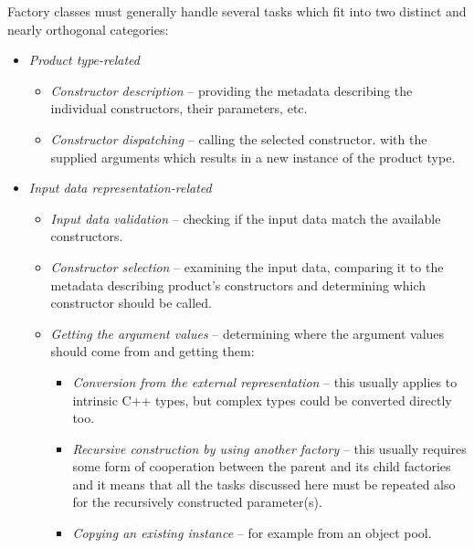 Factory classes must generally handle several tasks
which fit into two distinct and nearly orthogonal categories:

\begin{itemize}
\item{\emph{Product type-related}}
        \begin{itemize}
        \item{\emph{Constructor description}} -- providing the metadata describing
        the individual constructors, their parameters, etc.
        \item{\emph{Constructor dispatching}} -- calling the selected constructor.
        with the supplied arguments which results in a new instance of the product type.
        \end{itemize}

\item{\emph{Input data representation-related}}
        \begin{itemize}
        \item{\emph{Input data validation}} -- checking if the input data match
        the available constructors.
        \item{\emph{Constructor selection}} -- examining the input data, comparing it
        to the metadata describing product's constructors and determining
        which constructor should be called.
        \item{\emph{Getting the argument values}} -- determining where the argument
        values should come from and getting them:
                \begin{itemize}
                \item{\emph{Conversion from the external representation}} -- this usually applies
                to intrinsic C++ types, but complex types could be converted directly too.
                \item{\emph{Recursive construction by using another factory}} -- this usually
                requires some form of cooperation between the parent and its child factories
                and it means that all the tasks discussed here must be repeated also for
                the recursively constructed parameter(s).
                \item{\emph{Copying an existing instance}} -- for example from an object pool.
                \end{itemize}
        \end{itemize}
\end{itemize}


